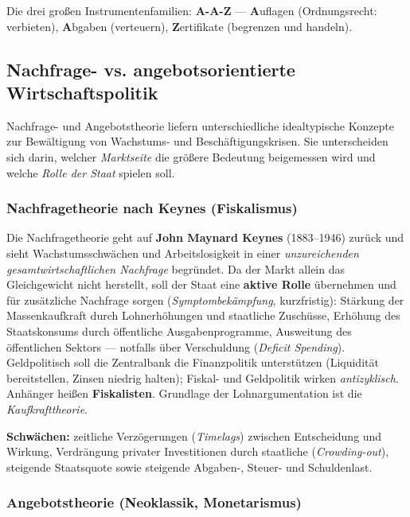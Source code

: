\documentclass[11pt, a4paper]{article}
\begin{document}
\begin{eselsbruecke}
Die drei großen Instrumentenfamilien: \textbf{A-A-Z} --- \textbf{A}uflagen (Ordnungsrecht:
verbieten), \textbf{A}bgaben (verteuern), \textbf{Z}ertifikate (begrenzen und handeln).
\end{eselsbruecke}

\subsection{Nachfrage- vs. angebotsorientierte Wirtschaftspolitik}

Nachfrage- und Angebotstheorie liefern unterschiedliche idealtypische Konzepte zur
Bewältigung von Wachstums- und Beschäftigungskrisen. Sie unterscheiden sich darin, welcher
\emph{Marktseite} die größere Bedeutung beigemessen wird und welche \emph{Rolle der Staat}
spielen soll.

\subsubsection{Nachfragetheorie nach Keynes (Fiskalismus)}

Die Nachfragetheorie geht auf \textbf{John Maynard Keynes} (1883--1946) zurück und sieht
Wachstumsschwächen und Arbeitslosigkeit in einer \emph{unzureichenden gesamtwirtschaftlichen
Nachfrage} begründet. Da der Markt allein das Gleichgewicht nicht herstellt, soll der Staat
eine \textbf{aktive Rolle} übernehmen und für zusätzliche Nachfrage sorgen
(\emph{Symptombekämpfung}, kurzfristig): Stärkung der Massenkaufkraft durch Lohnerhöhungen
und staatliche Zuschüsse, Erhöhung des Staatskonsums durch öffentliche Ausgabenprogramme,
Ausweitung des öffentlichen Sektors --- notfalls über Verschuldung (\emph{Deficit
Spending}). Geldpolitisch soll die Zentralbank die Finanzpolitik unterstützen (Liquidität
bereitstellen, Zinsen niedrig halten); Fiskal- und Geldpolitik wirken \emph{antizyklisch}.
Anhänger heißen \textbf{Fiskalisten}. Grundlage der Lohnargumentation ist die
\emph{Kaufkrafttheorie}.

\textbf{Schwächen:} zeitliche Verzögerungen (\emph{Timelags}) zwischen Entscheidung und
Wirkung, Verdrängung privater Investitionen durch staatliche (\emph{Crowding-out}),
steigende Staatsquote sowie steigende Abgaben-, Steuer- und Schuldenlast.

\subsubsection{Angebotstheorie (Neoklassik, Monetarismus)}
\end{document}
